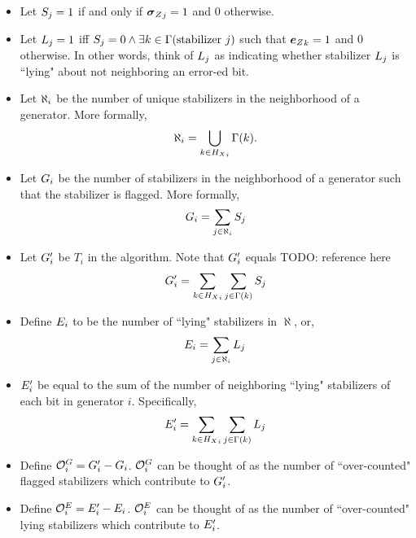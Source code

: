 \begin{itemize}
	\item Let $S_j = 1$ if and only if ${\boldsymbol{\sigma}_Z}_j = 1$ and 0 otherwise.
	\item Let ${L_j} = 1$ iff $S_j = 0 \wedge \exists k \in \Gamma(\text{stabilizer }j)$ 
	such that ${\boldsymbol{e}_Z}_k = 1$ and 0 otherwise. In other words, think of ${L_j}$ as indicating whether
	stabilizer ${L_j}$ is ``lying" about not neighboring an error-ed bit.
	\item Let ${\aleph_i}$ be the number of unique stabilizers in the neighborhood of a generator. More formally,
	$$
		{\aleph_i} = \bigcup_{k \in {H_X}_i} \Gamma(k).
	$$
	\item Let ${G_i}$ be the number of stabilizers in the neighborhood of a generator such 
	that the stabilizer is flagged. More formally,
	$$
		{G_i} = \sum_{j \in {\aleph_i}} S_j
	$$
	\item Let ${G'_i}$ be $T_i$ in the algorithm. Note that ${G'_i}$ equals TODO: reference here
		$$
			{G'_i} = \sum_{k \in {H_X}_i} \sum_{j \in \Gamma(k)} S_j 
		$$
	\item Define ${E_i}$ to be the number of ``lying" stabilizers in $\aleph$, or,
	$$
		{E_i} = \sum_{j \in {\aleph_i}} L_j
	$$
	\item ${E'_i}$ be equal to the sum of the number of neighboring ``lying" stabilizers of each bit in generator $i$.
	Specifically,
	$$
		{E'_i} = \sum_{k \in {H_X}_i} \sum_{j \in \Gamma(k)} {L_j}
	$$
	\item Define $\mathcal{O}^G_i = {G'_i} - {G_i}$. $\mathcal{O}^G_i$ can be thought of as the
	number of ``over-counted" flagged stabilizers which contribute to ${G'_i}$.
	\item Define $\mathcal{O}^E_i = {E'_i} - {E_i}$. $\mathcal{O}^E_i$ can be thought of as the
	number of ``over-counted" lying stabilizers which contribute to ${E'_i}$.
\end{itemize}


